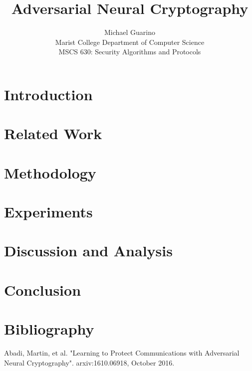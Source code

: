 \documentclass[12pt]{article}
\begin{document}
\title{Adversarial Neural Cryptography}
\author{Michael Guarino\\
        Marist College Department of Computer Science\\
        MSCS 630: Security Algorithms and Protocols}
\maketitle
\begin{abstract}

\end{abstract}

\section{Introduction}


\section{Related Work}


\section{Methodology}


\section{Experiments}


\section{Discussion and Analysis}


\section{Conclusion}


\section{Bibliography}

Abadi, Martin, et al. "Learning to Protect Communications
with Adversarial Neural Cryptography". arxiv:1610.06918, October 2016.
\newline
\end{document}
